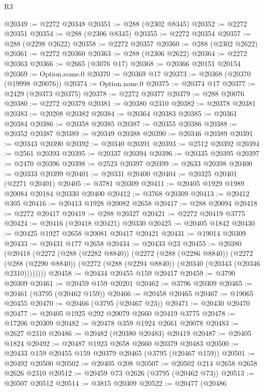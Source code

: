 \begin{lexlean}{R3}
\begin{coremodule}
@20349 := @2272 @20348
@20351 := @288 (@2302 @8345)
@20352 := @2272 @20351
@20354 := @288 (@2306 @8345)
@20355 := @2272 @20354
@20357 := @288 (@2298 @2622)
@20358 := @2272 @20357
@20360 := @288 (@2302 @2622)
@20361 := @2272 @20360
@20363 := @288 (@2306 @2622)
@20364 := @2272 @20363
@20366 := @2665 (@3076 @17)
@20368 := @20366 @20151 @20154
@20369 := Option.some.{0}
@20370 := @20369 @17
@20373 := @20368 (@20370 (@19998 @20076))
@20374 := Option.none.{0}
@20375 := @20374 @17
@20377 := @2429 (@20373 @20375)
@20378 := @2272 @20377
@20379 := @288 @20076
@20380 := @2272 @20379
@20381 := @20380 @2310
@20382 := @20378 @20381
@20383 := @20208 @20382
@20384 := @20364 @20383
@20385 := @20361 @20384
@20386 := @20358 @20385
@20387 := @20355 @20386
@20388 := @20352 @20387
@20389 := @20349 @20388
@20390 := @20346 @20389
@20391 := @20343 @20390
@20392 := @20340 @20391
@20393 := @2512 @20392
@20394 := @2561 @20393
@20395 := @20337 @20394
@20396 := @20335 @20395
@20397 := @2470 @20396
@20398 := @2523 @20397
@20399 := @2633 @20398
@20400 := @20333 @20399
@20401 := @20331 @20400
@20404 := @20325 @20401 (@2271 @20401)
@20405 := @3781 @20309
@20411 := @20405 @1929 @1989 @20084 @20184 @20330 @20400
@20412 := @3768 @20309
@20413 := @20412 @305
@20416 := @20413 @1928 @20082 @2658
@20417 := @288 @20094
@20418 := @2272 @20417
@20419 := @288 @20327
@20421 := @2272 @20419 @3775
@20424 := @20416 (@20418 @20421) @20330
@20425 := @20405 @1842
@20430 := @20425 @1927 @2658 @20081 @20417 @20421
@20431 := @19014 @20309
@20433 := @20431 @177 @2658
@20434 := @20433 @23
@20455 := @20380
    (@20418
      (@2272
        (@288 (@2282 @8840))
        (@2272
          (@288 (@2286 @8840))
          (@2272
            (@288 (@2290 @8840))
            (@2272 (@288 (@2294 @8840)) (@20340 (@20343 (@20346 @2310))))))))
@20458 := @20434 @20455 @159 @20417
@20459 := @3790 @20309
@20461 := @20459 @159 @20201
@20462 := @3796 @20309
@20465 := @20461 (@3795 (@20462 @159))
@20466 := @20458 @20465
@20467 := @19065 @20455
@20470 := @20466 (@3795 (@20467 @23))
@20471 := @20430 @20470
@20477 := @20405 @1925 @292 @20079 @2660 @20419 @3775
@20478 := @17206 @20309
@20482 := @20478 @359 @1924 @2661 @20078
@20483 := @2627 @2310
@20486 := @20482 (@20380 @20483) @20419
@20487 := @20405 @1824
@20492 := @20487 @1923 @2658 @2660 @20379 @20483
@20500 := @20433 @159 @20455 @159 @20379 @20465 (@3795 (@20467 @159))
@20501 := @20492 @20500
@20502 := @20405 @208
@20507 := @20502 @214 @2658 @2658 @2626 @2310
@20512 := @20459 @73 @2626 (@3795 (@20462 @73))
@20513 := @20507 @20512
@20514 := @3815 @20309
@20522 := @20477
    (@20486

\end{coremodule}
\end{lexlean}
